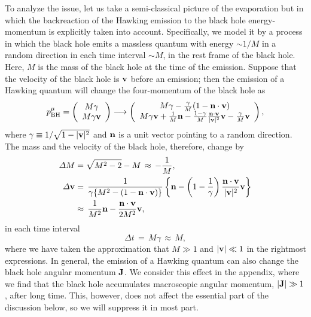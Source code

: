 \documentclass[12pt]{article}
\begin{document}
To analyze the issue, let us take a semi-classical picture of the 
evaporation but in which the backreaction of the Hawking emission to the 
black hole energy-momentum is explicitly taken into account.  Specifically, 
we model it by a process in which the black hole emits a massless quantum 
with energy $\sim 1/M$ in a random direction in each time interval 
$\sim M$, in the rest frame of the black hole.  Here, $M$ is the mass 
of the black hole at the time of the emission.  Suppose that the velocity 
of the black hole is ${\bf v}$ before an emission; then the emission of 
a Hawking quantum will change the four-momentum of the black hole as
%
\begin{equation}
  p_{\rm BH}^\mu = \left( \begin{array}{cc} 
    M\gamma \\ M\gamma {\bf v} \end{array} \right) 
  \longrightarrow \left( \begin{array}{cc} 
    M\gamma - \frac{\gamma}{M}(1-{\bf n}\cdot{\bf v}) \\ 
    M\gamma {\bf v} + \frac{1}{M}{\bf n} 
      - \frac{1-\gamma}{M}\frac{{\bf n}\cdot{\bf v}}{|{\bf v}|^2} 
      {\bf v} - \frac{\gamma}{M} {\bf v} \end{array} \right),
\label{eq:BH-emit}
\end{equation}
%
where $\gamma \equiv 1/\sqrt{1-|{\bf v}|^2}$ and ${\bf n}$ is a unit vector 
pointing to a random direction.  The mass and the velocity of the black hole, 
therefore, change by
%
\begin{align}
  \varDelta M &= \sqrt{M^2-2} - M 
  \,\approx\, -\frac{1}{M},
\label{eq:delta-M}\\
   \varDelta {\bf v} & =\, \frac{1}{\gamma \{M^2-(1-{\bf n}\cdot{\bf v})\}}
    \left\{ {\bf n} - \left(1-\frac{1}{\gamma}\right) 
    \frac{{\bf n}\cdot{\bf v}}{|{\bf v}|^2} {\bf v} \right\}
  \nonumber\\ & \approx\, \frac{1}{M^2}{\bf n} 
    - \frac{{\bf n}\cdot{\bf v}}{2M^2} {\bf v},
\label{eq:delta-v}
\end{align}
%
in each time interval
%
\begin{equation}
  \varDelta t \,=\, M \gamma \,\approx\, M,
\label{eq:delta-t}
\end{equation}
%
where we have taken the approximation that $M \gg 1$ and $|{\bf v}| \ll 1$ 
in the rightmost expressions.  In general, the emission of a Hawking 
quantum can also change the black hole angular momentum ${\bf J}$.  We 
consider this effect in the appendix, where we find that the black hole 
accumulates macroscopic angular momentum, $|{\bf J}| \gg 1$, after long 
time.  This, however, does not affect the essential part of the discussion 
below, so we will suppress it in most part.
\end{document}

